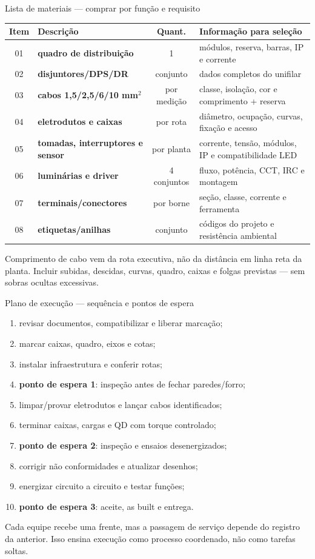 \begin{frame}{Lista de materiais — comprar por função e requisito}
\scriptsize
\begin{tabularx}{\textwidth}{c >{\bfseries}p{3.0cm}c X}
\toprule
Item & Descrição & Quant. & Informação para seleção \\
\midrule
01 & quadro de distribuição & 1 & módulos, reserva, barras, IP e corrente \\
02 & disjuntores/DPS/DR & conjunto & dados completos do unifilar \\
03 & cabos 1,5/2,5/6/10 mm$^2$ & por medição & classe, isolação, cor e comprimento + reserva \\
04 & eletrodutos e caixas & por rota & diâmetro, ocupação, curvas, fixação e acesso \\
05 & tomadas, interruptores e sensor & por planta & corrente, tensão, módulos, IP e compatibilidade LED \\
06 & luminárias e driver & 4 conjuntos & fluxo, potência, CCT, IRC e montagem \\
07 & terminais/conectores & por borne & seção, classe, corrente e ferramenta \\
08 & etiquetas/anilhas & conjunto & códigos do projeto e resistência ambiental \\
\bottomrule
\end{tabularx}
\begin{caixaAt}
Comprimento de cabo vem da rota executiva, não da distância em linha reta da planta. Incluir subidas, descidas, curvas, quadro, caixas e folgas previstas — sem sobras ocultas excessivas.
\end{caixaAt}
\end{frame}

\begin{frame}{Plano de execução — sequência e pontos de espera}
\scriptsize
\begin{enumerate}
\item revisar documentos, compatibilizar e liberar marcação;
\item marcar caixas, quadro, eixos e cotas;
\item instalar infraestrutura e conferir rotas;
\item \textbf{ponto de espera 1}: inspeção antes de fechar paredes/forro;
\item limpar/provar eletrodutos e lançar cabos identificados;
\item terminar caixas, cargas e QD com torque controlado;
\item \textbf{ponto de espera 2}: inspeção e ensaios desenergizados;
\item corrigir não conformidades e atualizar desenhos;
\item energizar circuito a circuito e testar funções;
\item \textbf{ponto de espera 3}: aceite, as built e entrega.
\end{enumerate}
\begin{caixaObs}
Cada equipe recebe uma frente, mas a passagem de serviço depende do registro da anterior. Isso ensina execução como processo coordenado, não como tarefas soltas.
\end{caixaObs}
\end{frame}

